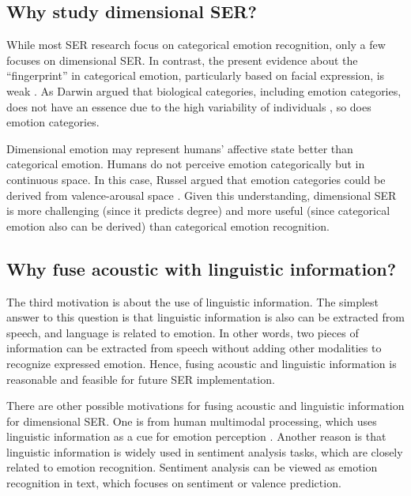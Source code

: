\subsection{Why study dimensional SER?}
While most SER research focus on categorical emotion recognition, only a few
focuses on dimensional SER. In contrast, the present evidence about the
``fingerprint'' in categorical emotion, particularly based on facial
expression, is weak \cite{Barrett2019}. As Darwin argued that biological
categories, including emotion categories, does not have an essence due to the
high variability of individuals \cite{charles1872expression}, so does emotion
categories. 

Dimensional emotion may represent humans' affective state better than
categorical emotion. Humans do not perceive emotion categorically but in
continuous space. In this case, Russel argued that emotion categories could be
derived from valence-arousal space \cite{Russel1980}. Given this understanding,
dimensional SER is more challenging (since it predicts degree) and more useful
(since categorical emotion also can be derived) than categorical emotion
recognition.


\subsection{Why fuse acoustic with linguistic information?}
The third motivation is about the use of linguistic information. The simplest
answer to this question is that linguistic information is also can be extracted
from speech, and language is related to emotion. In other words, two pieces of
information can be extracted from speech without adding other modalities to
recognize expressed emotion. Hence, fusing acoustic and linguistic information
is reasonable and feasible for future SER implementation.

There are other possible motivations for fusing acoustic and linguistic
information for dimensional SER. One is from human multimodal processing, which
uses linguistic information as a cue for emotion perception
\cite{Lindquist2006}.  Another reason is that linguistic information is widely
used in sentiment analysis tasks, which are closely related to emotion
recognition. Sentiment analysis can be viewed as emotion recognition in text,
which focuses on sentiment or valence prediction.

